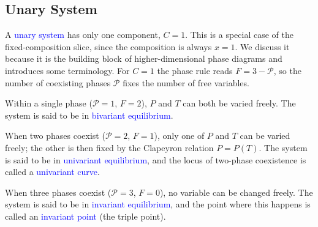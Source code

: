 \subsection{Unary System}
A \textcolor{blue}{unary system} has only one component, $C=1$. This is a special case of the
fixed-composition slice, since the composition is always $x=1$. We discuss it
because it is the building block of higher-dimensional phase diagrams and
introduces some terminology. For $C=1$ the phase rule reads
$F = 3-\mathcal{P}$, so the number of coexisting phases $\mathcal{P}$ fixes the
number of free variables.

Within a single phase ($\mathcal{P}=1$, $F=2$), $P$ and $T$ can both be varied
freely. The system is said to be in \textcolor{blue}{bivariant equilibrium}.

When two phases coexist ($\mathcal{P}=2$, $F=1$), only one of $P$ and $T$ can be
varied freely; the other is then fixed by the Clapeyron relation $P=P(T)$. The
system is said to be in \textcolor{blue}{univariant equilibrium}, and the locus
of two-phase coexistence is called a \textcolor{blue}{univariant curve}.

When three phases coexist ($\mathcal{P}=3$, $F=0$), no variable can be changed
freely. The system is said to be in \textcolor{blue}{invariant equilibrium}, and
the point where this happens is called an \textcolor{blue}{invariant point}
(the triple point).

    